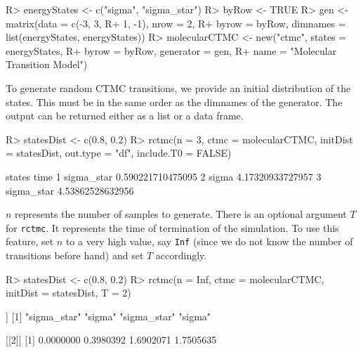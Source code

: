 \documentclass[article,nojss]{jss}
\begin{document}
\begin{CodeChunk}

\begin{CodeInput}
R> energyStates <- c("sigma", "sigma_star")
R> byRow <- TRUE
R> gen <- matrix(data = c(-3, 3,
R+                        1, -1), nrow = 2,
R+               byrow = byRow, dimnames = list(energyStates, energyStates))
R> molecularCTMC <- new("ctmc", states = energyStates, 
R+                  byrow = byRow, generator = gen, 
R+                  name = "Molecular Transition Model")      
\end{CodeInput}
\end{CodeChunk}

To generate random CTMC transitions, we provide an initial distribution of the states. This must be in the same order as the dimnames of the generator. The output can be returned either as a list or a data frame.

\begin{CodeChunk}

\begin{CodeInput}
R> statesDist <- c(0.8, 0.2)
R> rctmc(n = 3, ctmc = molecularCTMC, initDist = statesDist, out.type = "df", include.T0 = FALSE)
\end{CodeInput}

\begin{CodeOutput}
      states              time
1 sigma_star 0.590221710475095
2      sigma  4.17320933727957
3 sigma_star  4.53862528632956
\end{CodeOutput}
\end{CodeChunk}

\(n\) represents the number of samples to generate. There is an optional argument \(T\) for \texttt{rctmc}. It represents the time of termination of the simulation. To use this feature, set \(n\) to a very high value, say \texttt{Inf} (since we do not know the number of transitions before hand) and set \(T\) accordingly.

\begin{CodeChunk}

\begin{CodeInput}
R> statesDist <- c(0.8, 0.2)
R> rctmc(n = Inf, ctmc = molecularCTMC, initDist = statesDist, T = 2)
\end{CodeInput}

\begin{CodeOutput}
[[1]]
[1] "sigma_star" "sigma"      "sigma_star" "sigma"     

[[2]]
[1] 0.0000000 0.3980392 1.6902071 1.7505635
\end{CodeOutput}
\end{CodeChunk}
\end{document}
